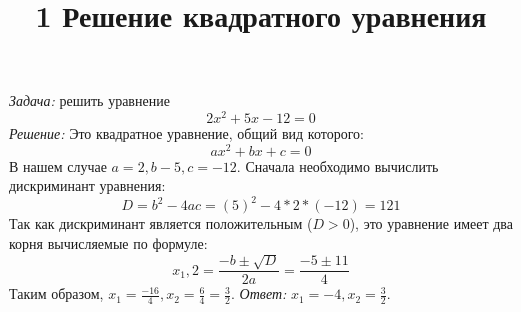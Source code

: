 \documentclass{article}
\begin{document}
\title{\textbf{1 Решение квадратного уравнения}}
\emph{Задача:} решить уравнение \[ 2x^2 + 5x - 12 = 0 \]
    \emph{Решение:} Это квадратное уравнение, общий вид которого:
\[ ax^2 + bx + c = 0 \]
В нашем случае $a = 2, b - 5, c = -12$.
    Сначала необходимо вычислить дискриминант уравнения:
\[ D = b^2 - 4ac = (5)^2 - 4 * 2 * (-12) = 121 \]
Так как дискриминант является положительным ($D > 0$), это уравнение имеет два корня вычисляемые по формуле:
\[ x_1,2 = \frac{-b \pm \sqrt{D}}{2a} = \frac{-5 \pm 11}{4} \]
Таким образом, \( x_1 = \frac{-16}{4}, x_2 = \frac{6}{4} = \frac{3}{2} \).
    \emph{Ответ:} \( x_1 = -4, x_2 = \frac{3}{2} \).
\end{document}
